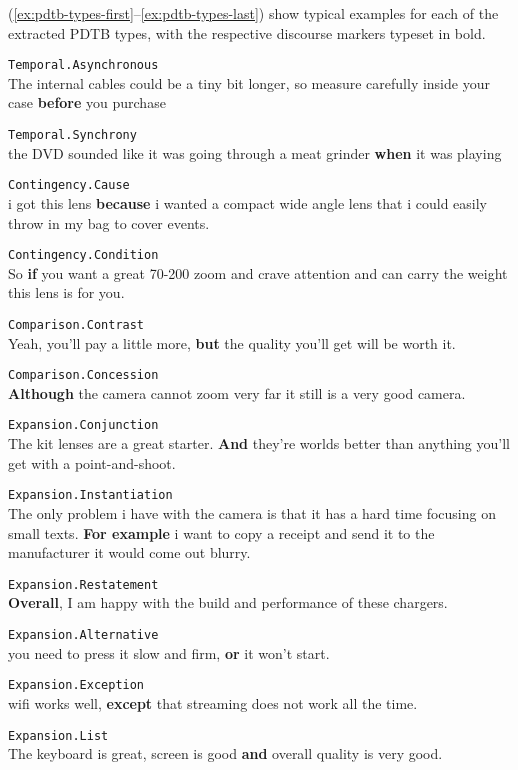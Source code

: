 \documentclass[
    a4paper,%
    12pt,%
    oneside,%
    toc=bibliography,
    final,
]{scrartcl}
\begin{document}
(\ref{ex:pdtb-types-first}–\ref{ex:pdtb-types-last}) show typical examples for each of the extracted PDTB types, with the respective discourse markers typeset in bold.

\begin{exe}
\ex\label{ex:pdtb-types-first} \lstinline|Temporal.Asynchronous|\\
The internal cables could be a tiny bit longer, so measure carefully inside your case \textbf{before} you purchase

\ex \lstinline|Temporal.Synchrony|\\
the DVD sounded like it was going through a meat grinder \textbf{when} it was playing

\ex \lstinline|Contingency.Cause|\\
i got this lens \textbf{because} i wanted a compact wide angle lens that i could easily throw in my bag to cover events.

\ex \lstinline|Contingency.Condition|\\
So \textbf{if} you want a great 70-200 zoom and crave attention and can carry the weight this lens is for you.

\ex \lstinline|Comparison.Contrast|\\
Yeah, you'll pay a little more, \textbf{but} the quality you'll get will be worth it.

\ex \lstinline|Comparison.Concession|\\
\textbf{Although} the camera cannot zoom very far it still is a very good camera.

\ex \lstinline|Expansion.Conjunction|\\
The kit lenses are a great starter. \textbf{And} they're worlds better than anything you'll get with a point-and-shoot.

\ex \lstinline|Expansion.Instantiation|\\
The only problem i have with the camera is that it has a hard time focusing on small texts. \textbf{For example} i want to copy a receipt and send it to the manufacturer it would come out blurry.

\ex \lstinline|Expansion.Restatement|\\
\textbf{Overall}, I am happy with the build and performance of these chargers.

\ex \lstinline|Expansion.Alternative|\\
you need to press it slow and firm, \textbf{or} it won't start.

\ex \lstinline|Expansion.Exception|\\
wifi works well, \textbf{except} that streaming does not work all the time.

\ex\label{ex:pdtb-types-last} \lstinline|Expansion.List|\\
The keyboard is great, screen is good \textbf{and} overall quality is very good.
\end{exe}
\end{document}
